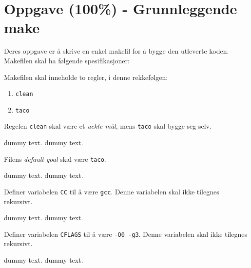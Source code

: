 \section{Oppgave (100\%) - Grunnleggende make}\label{sec:3-oppgave}

Deres oppgave er å skrive en enkel makefil for å bygge den utleverte koden. Makefilen skal ha følgende spesifikasjoner:



\begin{subprob}
    Makefilen skal inneholde to regler, i denne rekkefølgen:
    \begin{enumerate}
        \item \verb|clean|
        \item \verb|taco|
    \end{enumerate}
    Regelen \verb|clean| skal være et \textit{uekte mål}, mens \verb|taco| skal bygge seg selv.
	\begin{solution}
	    dummy text. dummy text. 
	\end{solution}
\end{subprob}



\begin{subprob}
    Filens \textit{default goal} skal være \verb|taco|.
	\begin{solution}
        dummy text. dummy text. 
	\end{solution}
\end{subprob}


\begin{subprob}
    Definer variabelen \verb|CC| til å være \verb|gcc|. Denne variabelen skal ikke tilegnes rekursivt.
	\begin{solution}
        dummy text. dummy text. 
	\end{solution}
\end{subprob}


\begin{subprob}
    Definer variabelen \verb|CFLAGS| til å være \verb|-O0 -g3|. Denne variabelen skal ikke tilegnes rekursivt.
	\begin{solution}
        dummy text. dummy text. 
	\end{solution}
\end{subprob}

